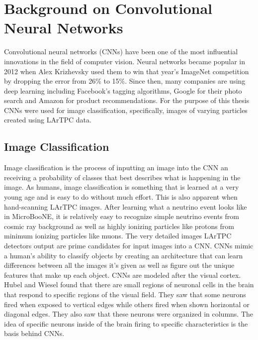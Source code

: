 \chapter{Background on Convolutional Neural Networks}\label{ch:cnn}
Convolutional neural networks (CNNs) have been one of the most influential innovations in the field of computer vision. Neural networks became popular in 2012 when Alex Krizhevsky used them to win that year's ImageNet competition\cite{alexnet} by dropping the error from 26\% to 15\%. Since then, many companies are using deep learning including Facebook's tagging algorithms, Google for their photo search and Amazon for product recommendations. For the purpose of this thesis CNNs were used for image classification, specifically, images of varying particles created using LArTPC data. 

\section{Image Classification} 
Image classification is the process of inputting an image into the CNN an receiving a probability of classes that best describes what is happening in the image. As humans, image classification is something that is learned at a very young age and is easy to do without much effort. This is also apparent when hand-scanning LArTPC images. After learning what a neutrino event looks like in MicroBooNE, it is relatively easy to recognize simple neutrino events from cosmic ray background as well as highly ionizing particles like protons from minimum ionizing particles like muons. The very detailed images LArTPC detectors output are prime candidates for input images into a CNN. CNNs mimic a human's ability to classify objects by creating an architecture that can learn differences between all the images it's given as well as figure out the unique features that make up each object. CNNs are modeled after the visual cortex. Hubel and Wiesel\cite{hubel} found that there are small regions of neuronal cells in the brain that respond to specific regions of the visual field. They saw that some neurons fired when exposed to vertical edges while others fired when shown horizontal or diagonal edges. They also saw that these neurons were organized in columns. The idea of specific neurons inside of the brain firing to specific characteristics is the basis behind CNNs.

